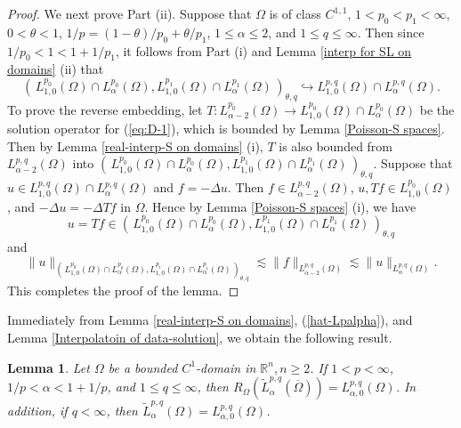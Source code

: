 \documentclass[reqno,centertags,11pt]{amsart}
\newtheorem{lem}[thm]{Lemma}
\theoremstyle{definition}
\numberwithin{thm}{section}
\numberwithin{equation}{section}
\newcommand{\R}{{\mathbb{R}}}
\begin{document}
\begin{proof}
We next prove Part (ii).   Suppose  that $\Omega$ is of class $C^{1,1}$,  $1<p_0 <  p_1 <\infty$, $0< \theta < 1$, $1/p=(1-\theta)/p_0 +\theta/p_1$, $1 \le \alpha \le 2$, and $1 \le q \le \infty$. Then since $1/p_0 < 1 < 1+1/p_1$, it follows from Part (i) and Lemma \ref{interp for SL on domains} (ii) that
\[
\left(\, L_{1 ,0}^{p_0}(\Omega ) \cap  L_{\alpha}^{p_0}(\Omega ) , L_{1,0}^{p_1}(\Omega ) \cap L_{\alpha}^{p_1}(\Omega ) \, \right)_{\theta,q} \hookrightarrow   L_{1 ,0}^{p, q}(\Omega )   \cap     L_{\alpha}^{p, q}(\Omega ) .
\]
To prove the reverse embedding, let    $T : L_{\alpha-2}^{p_0} (\Omega ) \to L_{1 ,0}^{p_0}(\Omega ) \cap L_{\alpha}^{p_0} (\Omega )$ be the solution operator for (\ref{eq:D-1}), which is bounded by Lemma \ref{Poisson-S spaces}. Then by Lemma \ref{real-interp-S on domains} (i), $T$ is also bounded from $  L_{\alpha-2}^{p,q}(\Omega ) $ into $\left(\, L_{1 ,0}^{p_0}(\Omega ) \cap  L_{\alpha}^{p_0}(\Omega ) , L_{1,0}^{p_1}(\Omega ) \cap L_{\alpha}^{p_1}(\Omega ) \, \right)_{\theta,q}$. Suppose that $u \in L_{1 ,0}^{p, q}(\Omega )   \cap     L_{\alpha}^{p, q}(\Omega )$ and $f= -\Delta u$. Then  $f \in    L_{\alpha-2}^{p,q}(\Omega ) $,  $u, Tf \in L_{1 ,0}^{p_0}(\Omega )$, and $-\Delta u =-\Delta Tf$ in $\Omega$. Hence by Lemma \ref{Poisson-S spaces} (i), we have
\[
u =Tf \in \left(\, L_{1 ,0}^{p_0}(\Omega ) \cap  L_{\alpha}^{p_0}(\Omega ) , L_{1,0}^{p_1}(\Omega ) \cap L_{\alpha}^{p_1}(\Omega ) \, \right)_{\theta,q}
\]
and
\[
\|u\|_{\left(\, L_{1 ,0}^{p_0}(\Omega ) \cap  L_{\alpha}^{p_0}(\Omega ) , L_{1,0}^{p_1}(\Omega ) \cap L_{\alpha}^{p_1}(\Omega ) \, \right)_{\theta,q}} \lesssim  \|f\|_{     L_{\alpha-2}^{p, q}(\Omega )} \lesssim \|u\|_{     L_{\alpha}^{p, q}(\Omega )}.
\]
This completes the proof of the lemma.
\end{proof}


Immediately from Lemma  \ref{real-interp-S on domains}, (\ref{hat-Lpalpha}), and Lemma  \ref{Interpolatoin of data-solution}, we    obtain the following  result.

\begin{lem}\label{R-tilde equal zero trac}  Let $\Omega$ be  a bounded $C^1$-domain in $\R^n , n \ge 2  $. If   $1<p<\infty$, $1/p <\alpha<1+ 1/p$, and $1 \le q \le \infty$,  then
$R_\Omega  ( \widetilde{L}_\alpha^{p,q}(\overline{\Omega} )) = L_{\alpha, 0}^{p,q}(\Omega )$. In addition, if $ q<\infty$, then
$\widetilde{L}_\alpha^{p,q}(\Omega ) = L_{\alpha, 0}^{p,q}(\Omega )$.
\end{lem}
\end{document}
